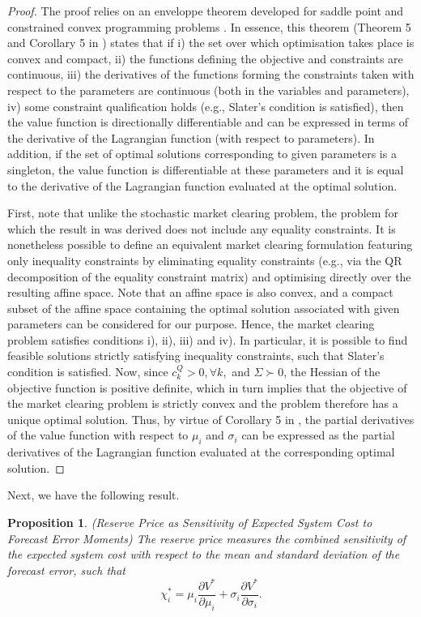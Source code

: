 \documentclass{article}
\newtheorem{proposition}{Proposition}
\begin{document}
\begin{proof}
The proof relies on an enveloppe theorem developed for saddle point and constrained convex programming problems \cite{Milgrom2002}. In essence, this theorem (Theorem 5 and Corollary 5 in \cite{Milgrom2002}) states that if i) the set over which optimisation takes place is convex and compact, ii) the functions defining the objective and constraints are continuous, iii) the derivatives of the functions forming the constraints taken with respect to the parameters are continuous (both in the variables and parameters), iv) some constraint qualification holds (e.g., Slater's condition is satisfied), then the value function is directionally differentiable and can be expressed in terms of the derivative of the Lagrangian function (with respect to parameters). In addition, if the set of optimal solutions corresponding to given parameters is a singleton, the value function is differentiable at these parameters and it is equal to the derivative of the Lagrangian function evaluated at the optimal solution.

First, note that unlike the stochastic market clearing problem, the problem for which the result in \cite{Milgrom2002} was derived does not include any equality constraints. It is nonetheless possible to define an equivalent market clearing formulation featuring only inequality constraints by eliminating equality constraints (e.g., via the QR decomposition of the equality constraint matrix) and optimising directly over the resulting affine space. Note that an affine space is also convex, and a compact subset of the affine space containing the optimal solution associated with given parameters can be considered for our purpose. Hence, the market clearing problem satisfies conditions i), ii), iii) and iv). In particular, it is possible to find feasible solutions strictly satisfying inequality constraints, such that Slater's condition is satisfied. Now, since $c_k^Q > 0, \forall k,$ and $\Sigma \succ 0$, the Hessian of the objective function is positive definite, which in turn implies that the objective of the market clearing problem is strictly convex and the problem therefore has a unique optimal solution. Thus, by virtue of Corollary 5 in \cite{Milgrom2002}, the partial derivatives of the value function with respect to $\mu_i$ and $\sigma_i$ can be expressed as the partial derivatives of the Lagrangian function evaluated at the corresponding optimal solution.
\end{proof}
Next, we have the following result.
\begin{proposition}\label{SensitivityReservePrice}
(Reserve Price as Sensitivity of Expected System Cost to Forecast Error Moments) The reserve price measures the combined sensitivity of the expected system cost with respect to the mean and standard deviation of the forecast error, such that
\begin{equation*}
\chi_i^* = \mu_i \frac{\partial V^*}{\partial \mu_i} + \sigma_i \frac{\partial V^*}{\partial \sigma_i}.
\end{equation*}
\end{proposition}
\end{document}
